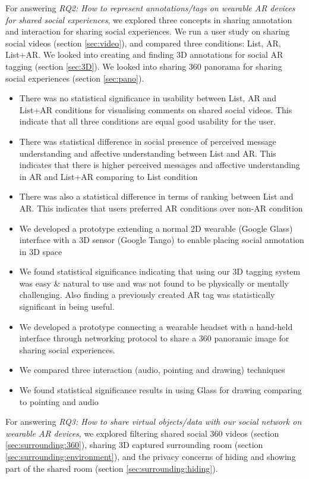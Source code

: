 For answering \textit{RQ2: How to represent annotations/tags on wearable AR devices for shared social experiences}, we explored three concepts in sharing annotation and interaction for sharing social experiences. We run a user study on sharing social videos (section \ref{sec:video}), and compared three conditions: List, AR, List+AR. We looked into creating and finding 3D annotations for social AR tagging (section \ref{sec:3D}). We looked into sharing 360 panorama for sharing social experiences (section \ref{sec:pano}). 

\begin{itemize}
    \item{There was no statistical significance in usability between List, AR and List+AR conditions for visualising comments on shared social videos. This indicate that all three conditions are equal good usability for the user.}
    \item{There was statistical difference in social presence of perceived message understanding and affective understanding between List and AR. This indicates that there is higher perceived messages and affective understanding in AR and List+AR comparing to List condition}
    \item{There was also a statistical difference in terms of ranking between List and AR. This indicates that users preferred AR conditions over non-AR condition}
    \item{We developed a prototype extending a normal 2D wearable (Google Glass) interface with a 3D sensor (Google Tango) to enable placing social annotation in 3D space}
    \item{We found statistical significance indicating that using our 3D tagging system was easy \& natural to use and was not found to be physically or mentally challenging. Also finding a previously created AR tag was statistically significant in being useful.}
    \item{We developed a prototype connecting a wearable headset with a hand-held interface through networking protocol to share a 360 panoramic image for sharing social experiences.}
    \item{We compared three interaction (audio, pointing and drawing) techniques}
    \item{We found statistical significance results in using Glass for drawing comparing to pointing and audio}
\end{itemize}

For answering \textit{RQ3: How to share virtual objects/data with our social network on wearable AR devices}, we explored filtering shared social 360 videos (section \ref{sec:surrounding:360}), sharing 3D captured surrounding room (section \ref{sec:surrounding:environment}), and the privacy concerns of hiding and showing part of the shared room (section \ref{sec:surrounding:hiding}). 

